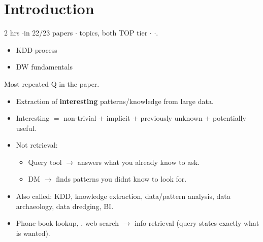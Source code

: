 \section{Introduction}

{\color{sub}\footnotesize 2 hrs \gap$\cdot$\gap in 22/23 papers \gap$\cdot$ topics, both TOP tier \gap$\cdot$\gap {} \gap$\cdot$\gap {}.}

\begin{itemize}
  \item KDD process 
  \item DW fundamentals 
\end{itemize}

\hr


{\color{sub}\footnotesize {}  \gap Most repeated Q in the paper.}

\begin{itemize}
  \item Extraction of \textbf{interesting} patterns/knowledge from large data.
  \item Interesting $=$ non-trivial $+$ implicit $+$ previously unknown $+$ potentially useful.
  \item Not retrieval:
  \begin{itemize}
    \item Query tool $\rightarrow$ answers what you already know to ask.
    \item DM $\rightarrow$ finds patterns you didnt know to look for.
  \end{itemize}
  \item Also called: KDD, knowledge extraction, data/pattern analysis, data archaeology, data dredging, BI.
\end{itemize}

\begin{itemize}
  \item Phone-book lookup, , web search $\rightarrow$ info retrieval (query states exactly what is wanted).
\end{itemize}

